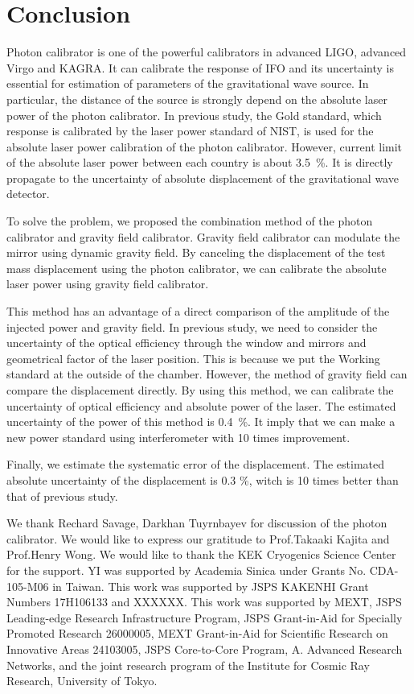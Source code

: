 \documentclass[A4]{spie}  %
\begin{document}
\section{Conclusion}
Photon calibrator is one of the powerful calibrators in advanced LIGO, advanced Virgo and KAGRA. It can calibrate the response of IFO and its uncertainty is essential for estimation of parameters of the gravitational wave source. In particular, the distance of the source is strongly depend on the absolute laser power of the photon calibrator. In previous study, the Gold standard, which response is calibrated by the laser power standard of NIST, is used for the absolute laser power calibration of the photon calibrator. However, current limit of the absolute laser power between each country is about 3.5~\%. It is directly propagate to the uncertainty of absolute displacement of the gravitational wave detector.

To solve the problem, we proposed the combination method of the photon calibrator and gravity field calibrator. Gravity field calibrator can modulate the mirror using dynamic gravity field. By canceling the displacement of the test mass displacement using the photon calibrator, we can calibrate the absolute laser power using gravity field calibrator.

This method has an advantage of a direct comparison of the amplitude of the injected power and gravity field. In previous study, we need to consider the uncertainty of the optical efficiency through the window and mirrors  and geometrical factor of the laser position. This is because we put the Working standard at the outside of the chamber. However, the method of gravity field can compare the displacement directly. By using this method, we can calibrate the uncertainty of optical efficiency and absolute power of the laser.  The estimated uncertainty of the power of this method is 0.4~\%. It imply that we can make a new power standard using interferometer with 10 times improvement.

Finally, we estimate the systematic error of the displacement. The estimated absolute uncertainty of the displacement is 0.3 \%, witch is 10 times better than that of previous study.
\acknowledgments     %
 
We thank Rechard Savage, Darkhan Tuyrnbayev for discussion of the photon calibrator. We would like to express our gratitude to Prof.Takaaki Kajita and Prof.Henry Wong. We would like to thank the KEK Cryogenics Science Center for the support. YI was supported by Academia Sinica under Grants No. CDA-105-M06 in Taiwan. This work was supported by JSPS KAKENHI Grant Numbers 17H106133 and XXXXXX. This work was supported by MEXT, JSPS Leading-edge Research Infrastructure Program, JSPS Grant-in-Aid for Specially Promoted
Research 26000005, MEXT Grant-in-Aid for Scientific Research on
Innovative Areas 24103005, JSPS Core-to-Core Program, A. Advanced
Research Networks, and the joint research program of the Institute for
Cosmic Ray Research, University of Tokyo.


\end{document}
